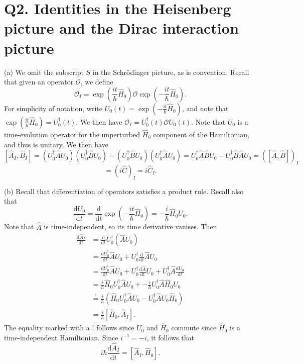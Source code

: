 \documentclass[11pt, letterpaper]{article}
\begin{document}
\section{Q2. Identities in the Heisenberg picture and the Dirac interaction picture}
 
(a) We omit the subscript $S$ in the Schr\"odinger picture, as is convention. Recall that given an operator $\mathcal{O} $, we define
\[
	\mathcal{O} _I = \exp \left( \frac{it}{\hbar} \hat{H} _0 \right) \mathcal{O} \exp \left( -\frac{it}{\hbar} \hat{H} _0 \right) 
.\]
For simplicity of notation, write $U_0(t)=\exp \left( -\frac{it}{\hbar} \hat{H} _0 \right) $, and note that $\exp \left( \frac{it}{\hbar } \hat{H} _0 \right) =U_0^\dagger(t)$. We then have $\mathcal{O} _I=U_0^\dagger(t)\mathcal{O} U_0(t)$. Note that $U_0$ is a time-evolution operator for the unperturbed $\hat{H} _0$ component of the Hamiltonian, and thus is unitary. We then have
\[
	[\hat{A} _I,\hat{B} _I]=\left( U_0^\dagger \hat{A} U_0 \right) \left( U_0^\dagger \hat{B} U_0 \right) - \left( U_0^\dagger \hat{B} U_0 \right) \left( U_0^\dagger \hat{A} U_0 \right)=U_0^\dagger \hat{A} \hat{B} U_0 - U_0^\dagger \hat{B} \hat{A} U_0 = \left( [\hat{A} ,\hat{B} ]  \right)_I
\]
\[
	=\left( i \hat{C} \right)_I=i\hat{C}_I
.\]

(b) Recall that differentiation of operators satisfies a product rule. Recall also that
\[
	\frac{\mathrm{d}U_0}{\mathrm{d}t} =\frac{\mathrm{d}}{\mathrm{d}t} \exp \left( -\frac{it}{\hbar} \hat{H} _0 \right) =-\frac{i}{\hbar } \hat{H} _0 U_0
.\]
Note that $\hat{A} $ is time-independent, so its time derivative vanises. Then
\begin{align*}
	\frac{\mathrm{d}\hat{A} _I}{\mathrm{d}t} &=\frac{\mathrm{d}}{\mathrm{d}t} U_0^\dagger (\hat{A} U_0)\\
						 &=\frac{\mathrm{d}U_0^\dagger}{\mathrm{d}t} \hat{A} U_0 + U_0^\dagger \frac{\mathrm{d}}{\mathrm{d}t} \hat{A} U_0\\
						 &=\frac{\mathrm{d}U_0^\dagger}{\mathrm{d}t} \hat{A} U_0+U_0^\dagger \frac{\mathrm{d}\hat{A} }{\mathrm{d}t} U_0+U_0^\dagger \hat{A}  \frac{\mathrm{d}U_0}{\mathrm{d}t} \\
						 &=\frac{i}{\hbar } \hat{H} _0 U_0^\dagger \hat{A} U_0+-\frac{i}{\hbar } U_0^\dagger \hat{A} \hat{H} _0 U_0\\
						 &\overset{!}{=}\frac{i}{\hbar }  \left( \hat{H} _0U_0^\dagger \hat{A} U_0-U_0^\dagger \hat{A}U_0\hat{H} _0  \right) \\
						 &=\frac{i}{\hbar } [\hat{H} _0,\hat{A} _I]
.\end{align*}
The equality marked with a ! follows since $U_0$ and $\hat{H} _0$ commute since $\hat{H}_0 $ is a time-independent Hamiltonian. Since $i^{-1} =-i$, it follows that
\[
	i\hbar \frac{\mathrm{d}\hat{A} _I}{\mathrm{d}t} =[\hat{A} _I,\hat{H} _0]
.\]
\end{document}
